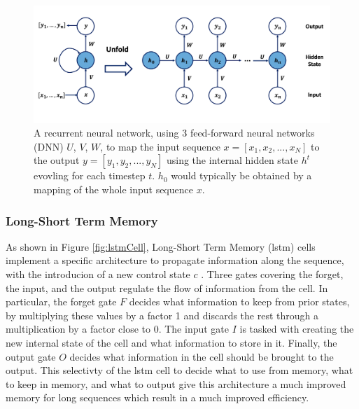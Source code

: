 \begin{figure}[h!]
    \center
    \includegraphics[scale=0.5]{Images/ML/rnn.png}
    \caption{A recurrent neural network, using 3 feed-forward neural networks (DNN) $U$, $V$, $W$, to map the input sequence $x = [x_1, x_2, ..., x_N]$ to the output $y = [y_1, y_2, ..., y_N]$ using the internal hidden state $h^t$ evovling for each timestep $t$. $h_0$ would typically be obtained by a mapping of the whole input sequence $x$. } 
    \label{fig:rnnNet}
\end{figure}

\subsubsection{Long-Short Term Memory} 
As shown in Figure \ref{fig:lstmCell}, Long-Short Term Memory (\gls{lstm}) cells implement a specific architecture to propagate information along the sequence, with the introducion of a new control state $c$ \cite{lstmPaper}. Three gates covering the forget, the input, and the output regulate the flow of information from the cell. In particular, the forget gate $F$ decides what information to keep from prior states, by multiplying these values by a factor 1 and discards the rest through a multiplication by a factor close to 0. The input gate $I$ is tasked with creating the new internal state of the cell and what information to store in it. Finally, the output gate $O$ decides what information in the cell should be brought to the output. This selectivty of the \gls{lstm} cell to decide what to use from memory, what to keep in memory, and what to output give this architecture a much improved memory for long sequences which result in a much improved efficiency. 


